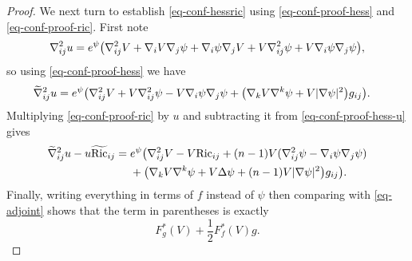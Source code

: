 \documentclass[10pt,a4paper]{amsart}
\begin{document}
\begin{proof}
	We next turn to establish \eqref{eq-conf-hessric} using \eqref{eq-conf-proof-hess} and \eqref{eq-conf-proof-ric}. First note
	\[
	\nabla_{ij}^2 u
	={\rm e}^{\psi}\bigl(\nabla_{ij}^2 V + \nabla_iV \nabla_j\psi + \nabla_i\psi \nabla_jV + V\nabla_{ij}^2\psi + V \nabla_i\psi \nabla_j\psi\bigr),
	\]
	so using \eqref{eq-conf-proof-hess} we have
	\begin{align}
		\widetilde\nabla_{ij}^2 u
		&={\rm e}^{\psi}\bigl(\nabla_{ij}^2 V + V\nabla_{ij}^2\psi - V \nabla_i\psi\nabla_j \psi
		+\big(\nabla_k V \nabla^k\psi+V|\nabla\psi|^2\big)g_{ij}\bigr). \label{eq-conf-proof-hess-u}
	\end{align}
	Multiplying \eqref{eq-conf-proof-ric} by $u$ and subtracting it from \eqref{eq-conf-proof-hess-u} gives
	\begin{align*}
		\widetilde\nabla_{ij}^2 u-u \widetilde{\mathrm{Ric}}_{ij}
={}&{\rm e}^{\psi}\bigl(\nabla_{ij}^2 V - V\mathrm{Ric}_{ij}
		+(n-1)V(\nabla_{ij}^2\psi-\nabla_i\psi \nabla_j\psi) \nonumber\\
		&
		+\big(\nabla_k V \nabla^k\psi+V\Delta\psi+(n-1)V|\nabla\psi|^2\big)g_{ij}\bigr). \label{eq-conf-proof-hessric-new}
	\end{align*}
	Finally, writing everything in terms of $f$ instead of $\psi$ then comparing with \eqref{eq-adjoint} shows that the term in parentheses is exactly
	\[
	F_g^*(V)+\frac12 F_f^*(V) g. \tag*{\qed}
	\]
\renewcommand{\qed}{}
\end{proof}
\end{document}
